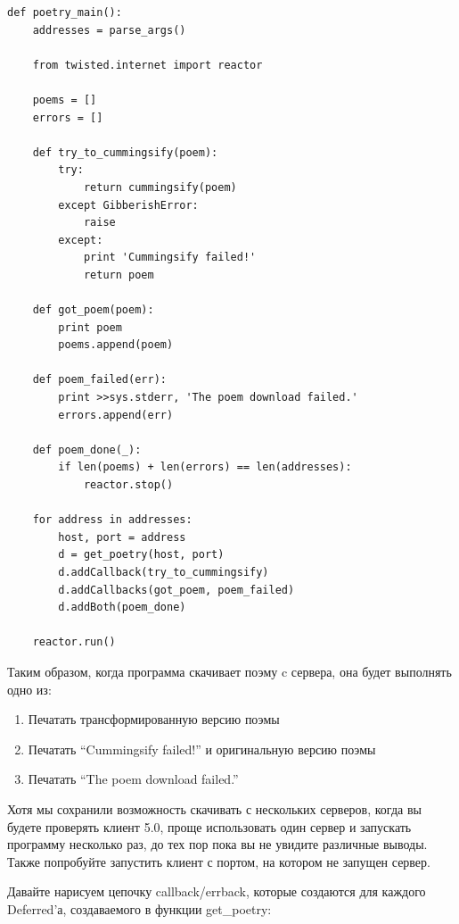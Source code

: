 \begin{scriptsize}\begin{verbatim}
def poetry_main():
    addresses = parse_args()

    from twisted.internet import reactor

    poems = []
    errors = []

    def try_to_cummingsify(poem):
        try:
            return cummingsify(poem)
        except GibberishError:
            raise
        except:
            print 'Cummingsify failed!'
            return poem

    def got_poem(poem):
        print poem
        poems.append(poem)

    def poem_failed(err):
        print >>sys.stderr, 'The poem download failed.'
        errors.append(err)

    def poem_done(_):
        if len(poems) + len(errors) == len(addresses):
            reactor.stop()

    for address in addresses:
        host, port = address
        d = get_poetry(host, port)
        d.addCallback(try_to_cummingsify)
        d.addCallbacks(got_poem, poem_failed)
        d.addBoth(poem_done)

    reactor.run()
\end{verbatim}\end{scriptsize}


Таким образом, когда программа скачивает поэму c сервера, она будет 
выполнять одно из:

\begin{enumerate}
\item Печатать трансформированную версию поэмы
\item Печатать “Cummingsify failed!” и оригинальную версию поэмы
\item Печатать “The poem download failed.” 
\end{enumerate}


Хотя мы сохранили возможность скачивать с нескольких серверов, 
когда вы будете проверять клиент 5.0, проще использовать один сервер и 
запускать программу несколько раз, до тех пор пока вы не увидите 
различные выводы. Также попробуйте запустить клиент с портом, на котором 
не запущен сервер.


Давайте нарисуем цепочку callback/errback, которые создаются для каждого 
Deferred'а, создаваемого в функции get\_poetry: 

